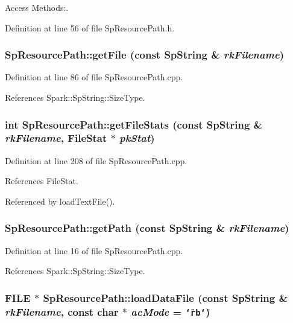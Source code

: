 Access Methods:. 

Definition at line 56 of file Sp\-Resource\-Path.h.
\subsubsection{ Sp\-Resource\-Path::get\-File (const {\bf Sp\-String} \& {\em rk\-Filename})}\label{classSpark_1_1SpResourcePath_a8}


Definition at line 86 of file Sp\-Resource\-Path.cpp.

References Spark::Sp\-String::Size\-Type.
\subsubsection{\setlength{\rightskip}{0pt plus 5cm}int Sp\-Resource\-Path::get\-File\-Stats (const {\bf Sp\-String} \& {\em rk\-Filename}, {\bf File\-Stat} $\ast$ {\em pk\-Stat})}\label{classSpark_1_1SpResourcePath_a12}


Definition at line 208 of file Sp\-Resource\-Path.cpp.

References File\-Stat.

Referenced by load\-Text\-File().
\subsubsection{ Sp\-Resource\-Path::get\-Path (const {\bf Sp\-String} \& {\em rk\-Filename})}\label{classSpark_1_1SpResourcePath_a7}


Definition at line 16 of file Sp\-Resource\-Path.cpp.

References Spark::Sp\-String::Size\-Type.
\subsubsection{\setlength{\rightskip}{0pt plus 5cm}FILE $\ast$ Sp\-Resource\-Path::load\-Data\-File (const {\bf Sp\-String} \& {\em rk\-Filename}, const char $\ast$ {\em ac\-Mode} = {\tt \char`\"{}rb\char`\"{}})}\label{classSpark_1_1SpResourcePath_a11}



